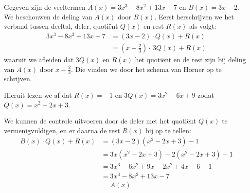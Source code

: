 \documentclass{ximera}
\begin{document}
\begin{example} 
Gegeven zijn de veeltermen $A(x) = 3x^3-8x^2+13x-7$ en $B(x) = 3x-2$. We beschouwen de deling van $A(x)$ door $B(x)$. Eerst herschrijven we het verband tussen deeltal, deler, quotiënt $Q(x)$ en rest $R(x)$ als volgt:
\begin{align*}
3x^3-8x^2+13x-7 
& = (3x-2)\cdot Q(x) + R(x) \\
& = \left(x-\frac{2}{3}\right) \cdot \,3Q(x) + R(x)
\end{align*}
waaruit we afleiden dat $3Q(x)$ en $R(x)$ het quotiënt en de rest zijn bij deling van $A(x)$ door $x - \frac{2}{3}$. Die vinden we door het schema van Horner op te schrijven.
\renewcommand{\kolbreed}{\widthof{$-8$}}


Hieruit lezen we af dat $R(x) = -1$ en $3Q(x) = 3x^2 - 6x + 9$ zodat $Q(x) = x^2-2x+3$.

We kunnen de controle uitvoeren door de deler met het quotiënt $Q(x)$ te vermenigvuldigen, en er daarna de rest $R(x)$ bij op te tellen:
\begin{align*}
B(x) \cdot Q(x) + R(x) 
& = (3x-2)(x^2-2x+3) - 1 \\
& = 3x(x^2-2x+3) - 2(x^2-2x+3) - 1 \\
& = 3x^3 - 6x^2 + 9x - 2x^2 + 4x - 6 - 1 \\
& =  3x^3-8x^2+13x-7 \\
& = A(x).
\end{align*}
\end{example} 
\end{document}
